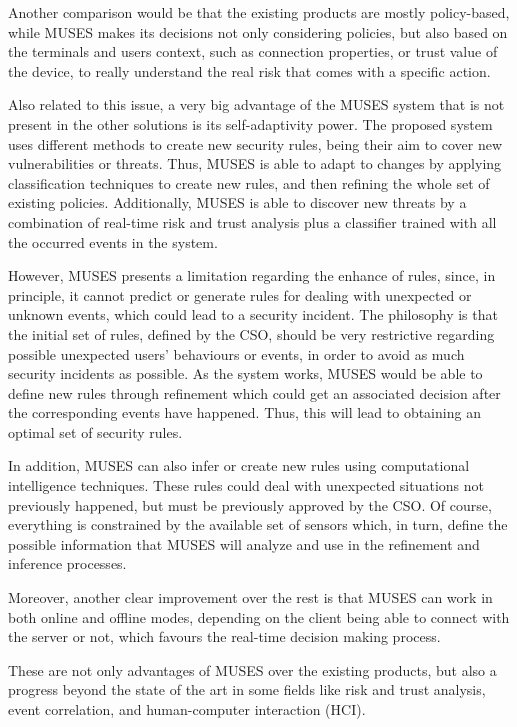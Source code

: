 Another comparison would be that the existing products are mostly policy-based, while MUSES makes its decisions not only considering policies, but also based on the terminals and users context, such as connection properties, or trust value of the device, to really understand the real risk that comes with a specific action.

Also related to this issue, a very big advantage of the MUSES system that is not present in the other solutions is its self-adaptivity power. The proposed system uses different methods to create new security rules, being their aim to cover new vulnerabilities or threats. Thus, MUSES is able to adapt to changes by applying classification techniques to create new rules, and then refining the whole set of existing policies. Additionally, MUSES is able to discover new threats by a combination of real-time risk and trust analysis plus a classifier trained with all the occurred events in the system.

However, MUSES presents a limitation regarding the enhance of rules, since, in principle, it cannot predict or generate rules for dealing
with unexpected or unknown events, which could lead to a security incident. The philosophy is that the initial set of rules, defined by the CSO, should be very restrictive regarding possible unexpected users' behaviours or events, in order to avoid as much security incidents as possible. As the system works, MUSES would be able to define new rules through refinement which could get an associated decision after the corresponding events have happened. Thus, this will lead to obtaining an optimal set of security rules.

In addition, MUSES can also infer or create new rules using computational intelligence techniques. These rules could deal with unexpected situations not previously happened, but must be previously approved by the CSO. Of course, everything is constrained by the available set of sensors which, in turn, define the possible information that MUSES will analyze and use in the refinement and inference processes.

Moreover, another clear improvement over the rest is that MUSES can work in both online and offline modes, depending on the client being able to connect with the server or not, which favours the real-time decision making process.

These are not only advantages of MUSES over the existing products, but also a progress beyond the state of the art in some fields like risk and trust analysis, event correlation, and human-computer interaction (HCI).

